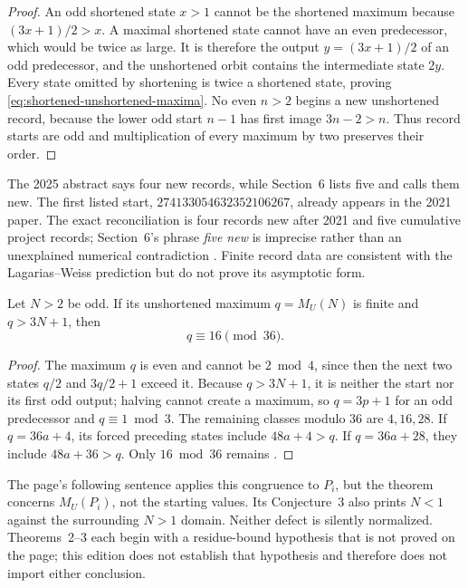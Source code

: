 \begin{proof}
An odd shortened state $x>1$ cannot be the shortened maximum because
$(3x+1)/2>x$.  A maximal shortened state cannot have an even predecessor,
which would be twice as large.  It is therefore the output $y=(3x+1)/2$ of
an odd predecessor, and the unshortened orbit contains the intermediate
state $2y$.  Every state omitted by shortening is twice a shortened state,
proving \eqref{eq:shortened-unshortened-maxima}.  No even $n>2$ begins a new
unshortened record, because the lower odd start $n-1$ has first image
$3n-2>n$.  Thus record starts are odd and multiplication of every maximum by
two preserves their order.
\end{proof}

The 2025 abstract says four new records, while Section~6 lists five and calls
them new.  The first listed start, $274133054632352106267$, already appears
in the 2021 paper.  The exact reconciliation is four records new after 2021
and five cumulative project records; Section~6's phrase \emph{five new} is
imprecise rather than an unexplained numerical contradiction
\cite[p.~7]{Barina2021}\cite[pp.~12--13]{Barina2025}.  Finite record data are
consistent with the Lagarias--Weiss prediction but do not prove its
asymptotic form.

\begin{proposition}
\label{prop:Roosendaal-mod36}
Let $N>2$ be odd.  If its unshortened maximum $q=M_U(N)$ is finite and
$q>3N+1$, then
\[
 q\equiv16\pmod{36}.
\]
\end{proposition}

\begin{proof}
The maximum $q$ is even and cannot be $2\bmod4$, since then the next two
states $q/2$ and $3q/2+1$ exceed it.  Because $q>3N+1$, it is neither the
start nor its first odd output; halving cannot create a maximum, so
$q=3p+1$ for an odd predecessor and $q\equiv1\bmod3$.  The remaining classes
modulo $36$ are $4,16,28$.  If $q=36a+4$, its forced preceding states include
$48a+4>q$.  If $q=36a+28$, they include $48a+36>q$.  Only $16\bmod36$
remains \cite{Roosendaal2026}.
\end{proof}

The page's following sentence applies this congruence to $P_i$, but the
theorem concerns $M_U(P_i)$, not the starting values.  Its Conjecture~3 also
prints $N<1$ against the surrounding $N>1$ domain.  Neither defect is
silently normalized.  Theorems~2--3 each begin with a residue-bound
hypothesis that is not proved on the page; this edition does not establish
that hypothesis and therefore does not import either conclusion.

